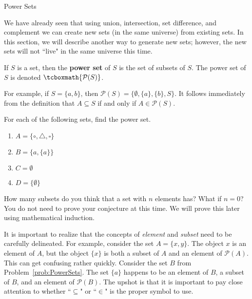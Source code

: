 \begin{section}{Power Sets}\label{sec:PowerSets}

We have already seen that using union, intersection, set difference, and complement we can create new sets (in the same universe) from existing sets.  In this section, we will describe another way to generate new sets; however, the new sets will not ``live" in the same universe this time.

\begin{definition}
If $S$ is a set, then the \textbf{power set} of $S$ is the set of subsets of $S$.  The power set of $S$ is denoted $\tcboxmath{\mathcal{P}(S)}$.
\end{definition}

For example, if $S=\{a,b\}$, then $\mathcal{P}(S)=\{\emptyset, \{a\}, \{b\}, S\}$. It follows immediately from the definition that $A\subseteq S$ if and only if $A\in\mathcal{P}(S)$. 
 
\begin{problem}\label{prob:PowerSets}
For each of the following sets, find the power set.
\begin{multicols}{2}
\begin{enumerate}[label=\textrm{(\alph*)}]
\item $A=\{\circ, \triangle, \square\}$
\item $B=\{a,\{a\}\}$
\item $C=\emptyset$
\item $D=\{\emptyset\}$
\end{enumerate}
\end{multicols}
\end{problem}

\begin{problem}\label{conjecture:PowerSets}
How many subsets do you think that a set with $n$ elements has?  What if $n=0$?  You do not need to prove your conjecture at this time.  We will prove this later using mathematical induction.
\end{problem}

It is important to realize that the concepts of \emph{element} and \emph{subset} need to be carefully delineated.  For example, consider the set $A=\{x,y\}$.  The object $x$ is an element of $A$, but the object $\{x\}$ is both a subset of $A$ and an element of $\mathcal{P}(A)$.  This can get confusing rather quickly.  Consider the set $B$ from Problem~\ref{prob:PowerSets}.  The set $\{a\}$ happens to be an element of $B$, a subset of $B$, and an element of  $\mathcal{P}(B)$. The upshot is that it is important to pay close attention to whether ``$\subseteq$" or ``$\in$" is the proper symbol to use.


\end{section}
